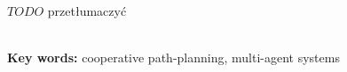 \\

\\

\begin{singlespacing}

$TODO$ przetłumaczyć

\flushbottom
\textbf{\\Key words: }cooperative path-planning, multi-agent systems
\end{singlespacing}
